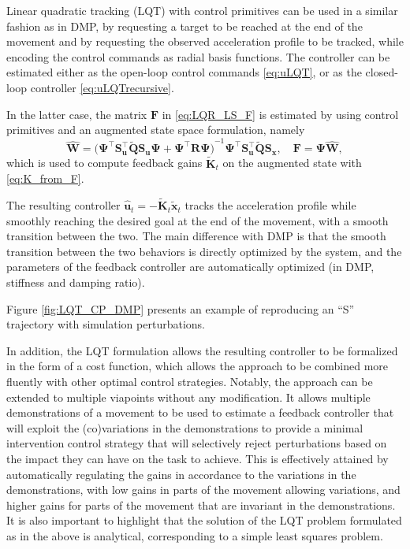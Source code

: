 \documentclass[10pt,a4paper]{article} %
\newcommand{\trsp}{{\scriptscriptstyle\top}}
\begin{document}
Linear quadratic tracking (LQT) with control primitives can be used in a similar fashion as in DMP, by requesting a target to be reached at the end of the movement and by requesting the observed acceleration profile to be tracked, while encoding the control commands as radial basis functions. The controller can be estimated either as the open-loop control commands \eqref{eq:uLQT}, or as the closed-loop controller \eqref{eq:uLQTrecursive}. 

In the latter case, the matrix $\bm{F}$ in \eqref{eq:LQR_LS_F} is estimated by using control primitives and an augmented state space formulation, namely
\begin{equation*}
	\bm{\hat{W}} = {\big(\bm{\Psi}^{\!\trsp} \bm{S}_{\bm{u}}^\trsp \bm{\tilde{Q}} \bm{S}_{\bm{u}} \bm{\Psi} + 
	\bm{\Psi}^{\!\trsp} \bm{R} \bm{\Psi}\big)}^{-1} \bm{\Psi}^{\!\trsp} \bm{S}_{\bm{u}}^\trsp \bm{\tilde{Q}} \bm{S}_{\bm{x}}, \quad
	\bm{F} = \bm{\Psi}\bm{\hat{W}},
\end{equation*}
which is used to compute feedback gains $\bm{\tilde{K}}_t$ on the augmented state with \eqref{eq:K_from_F}.

The resulting controller $\bm{\hat{u}}_t = -\bm{\tilde{K}}_t \bm{\tilde{x}}_t$ tracks the acceleration profile while smoothly reaching the desired goal at the end of the movement, with a smooth transition between the two. The main difference with DMP is that the smooth transition between the two behaviors is directly optimized by the system, and the parameters of the feedback controller are automatically optimized (in DMP, stiffness and damping ratio). 

Figure \ref{fig:LQT_CP_DMP} presents an example of reproducing an ``S'' trajectory with simulation perturbations.

In addition, the LQT formulation allows the resulting controller to be formalized in the form of a cost function, which allows the approach to be combined more fluently with other optimal control strategies. Notably, the approach can be extended to multiple viapoints without any modification. It allows multiple demonstrations of a movement to be used to estimate a feedback controller that will exploit the (co)variations in the demonstrations to provide a minimal intervention control strategy that will selectively reject perturbations based on the impact they can have on the task to achieve. This is effectively attained by automatically regulating the gains in accordance to the variations in the demonstrations, with low gains in parts of the movement allowing variations, and higher gains for parts of the movement that are invariant in the demonstrations. It is also important to highlight that the solution of the LQT problem formulated as in the above is analytical, corresponding to a simple least squares problem.
\end{document}
